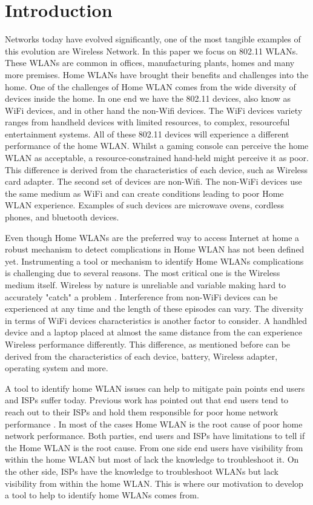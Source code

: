 \section{Introduction}\label{Introduction}


Networks today have evolved significantly, one of the most tangible examples of this evolution are Wireless Network. In this paper we focus on 802.11 WLANs. These WLANs are common in offices, manufacturing plants, homes and many more premises. Home WLANs have brought their benefits and challenges into the home. One of the challenges of Home WLAN comes from the wide diversity of devices inside the home. In one end we have the 802.11 devices, also know as WiFi devices, and in other hand the non-Wifi devices. The WiFi devices variety ranges from handheld devices with limited resources, to complex, resourceful entertainment systems. All of these 802.11 devices will experience a different performance of the home WLAN. Whilst a gaming console can perceive the home WLAN as acceptable, a resource-constrained hand-held might perceive it as poor. This difference is derived from the characteristics of each device, such as Wireless card adapter. The second set of devices are non-Wifi. The non-WiFi devices use the same medium as WiFi and can create conditions leading to poor Home WLAN experience. Examples of such devices are microwave ovens, cordless phones, and bluetooth devices.

Even though Home WLANs are the preferred way to access Internet at home \cite{predicting_effect_Home_Wifi} a robust mechanism to detect complications in Home WLAN has not been defined yet. Instrumenting a tool or mechanism to identify Home WLANs complications is challenging due to several reasons. The most critical one is the Wireless medium itself. Wireless by nature is unreliable and variable making hard to accurately "catch" a problem \cite{predicting_effect_Home_Wifi}. Interference from non-WiFi devices can be experienced at any time and the length of these episodes can vary. The diversity in terms of WiFi devices characteristics is another factor to consider. A handhled device and a laptop placed at almost the same distance from the can experience Wireless performance differently. This difference, as mentioned before can be derived from the characteristics of each device, battery, Wireless adapter, operating system and more.

A tool to identify home WLAN issues can help to mitigate pain points end users and ISPs suffer today. Previous work has pointed out that end users tend to reach out to their ISPs and hold them  responsible for poor home network performance \cite{passive_wifi_capacity_estimation}. In most of the cases Home WLAN is the root cause of poor home network performance. Both parties, end users and ISPs have limitations to tell if the Home WLAN is the root cause. From one side end users have visibility from within the home WLAN but most of lack the knowledge to troubleshoot it. On the other side, ISPs have the knowledge to troubleshoot WLANs but lack visibility from within the home WLAN. This is where our motivation to develop a tool to help to identify home WLANs comes from.


